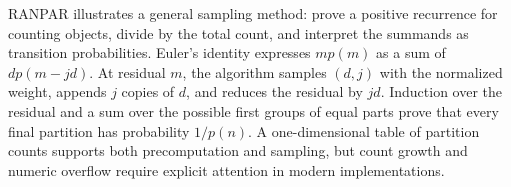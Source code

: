 \documentclass[10pt,letterpaper]{article}
\begin{document}
\begin{tcolorbox}[colback=Ink!4,colframe=Ink,title=Cornell summary]
RANPAR illustrates a general sampling method: prove a positive recurrence for counting objects, divide by the total count, and interpret the summands as transition probabilities. Euler's identity expresses $m p(m)$ as a sum of $d p(m-jd)$. At residual $m$, the algorithm samples $(d,j)$ with the normalized weight, appends $j$ copies of $d$, and reduces the residual by $jd$. Induction over the residual and a sum over the possible first groups of equal parts prove that every final partition has probability $1/p(n)$. A one-dimensional table of partition counts supports both precomputation and sampling, but count growth and numeric overflow require explicit attention in modern implementations.
\end{tcolorbox}
\end{document}
